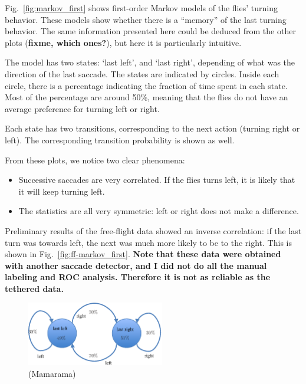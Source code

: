 Fig.~\ref{fig:markov_first} shows  first-order Markov models of the flies' turning behavior.
These models show whether there is a ``memory'' of the last turning behavior.
The same information presented here could be deduced from the other plots (\textbf{fixme, which ones?}), but here it is particularly intuitive.

The model has two states: `last left', and `last right', depending of what was the direction of the last saccade. The states are indicated by circles. Inside each circle, there is a percentage indicating the fraction of time spent in each state. 
Most of the percentage are around 50\%, meaning that the flies do not have an average preference for turning left or right.

Each state has two transitions, corresponding to the next action (turning right or left). The corresponding transition probability is shown as well.

From these plots, we notice two clear phenomena:

\begin{itemize} 
	\item  Successive saccades are very correlated. If the flies turns left, it is likely that it will keep turning left.
	
	\item  The statistics are all very symmetric: left or right does not make a difference.
	
\end{itemize}

Preliminary results of the free-flight data showed an inverse correlation: if the last turn was towards left, the next was much more likely to be to the right.  This is shown in  Fig.~\vref{fig:ff-markov_first}. \textbf{Note that these data were obtained with another saccade detector, and I did not do all the manual labeling and ROC analysis. Therefore it is not as reliable as the tethered data.}

\vfill
\begin{figure}[h!]
	\centering
	\includegraphics[width=6cm]{../comments/freeflight/markov_first}
	\caption{ \label{fig:ff-markov_first}  \Dmelanogaster (Mamarama) }
\end{figure}
